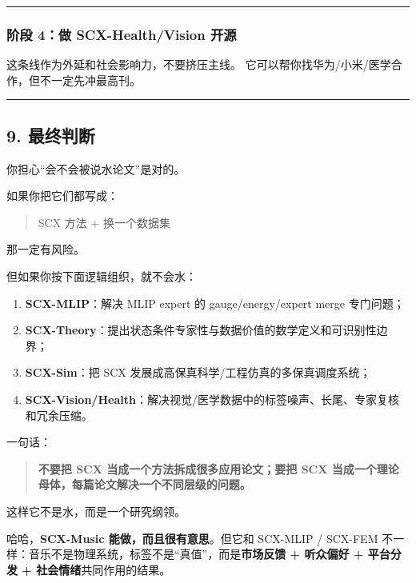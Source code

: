 \documentclass[
  12pt,
]{ctexart}
\providecommand{\tightlist}{%
  \setlength{\itemsep}{0pt}\setlength{\parskip}{0pt}}
\begin{document}
\begin{center}\rule{0.5\linewidth}{0.5pt}\end{center}

\subsubsection{阶段 4：做 SCX-Health/Vision
开源}\label{ux9636ux6bb5-4ux505a-scx-healthvision-ux5f00ux6e90}

这条线作为外延和社会影响力，不要挤压主线。
它可以帮你找华为/小米/医学合作，但不一定先冲最高刊。

\begin{center}\rule{0.5\linewidth}{0.5pt}\end{center}

\subsection{9. 最终判断}\label{ux6700ux7ec8ux5224ux65ad-11}

你担心``会不会被说水论文''是对的。

如果你把它们都写成：

\begin{quote}
SCX 方法 + 换一个数据集
\end{quote}

那一定有风险。

但如果你按下面逻辑组织，就不会水：

\begin{enumerate}
\def\labelenumi{\arabic{enumi}.}
\tightlist
\item
  \textbf{SCX-MLIP}：解决 MLIP expert 的 gauge/energy/expert merge
  专门问题；
\item
  \textbf{SCX-Theory}：提出状态条件专家性与数据价值的数学定义和可识别性边界；
\item
  \textbf{SCX-Sim}：把 SCX 发展成高保真科学/工程仿真的多保真调度系统；
\item
  \textbf{SCX-Vision/Health}：解决视觉/医学数据中的标签噪声、长尾、专家复核和冗余压缩。
\end{enumerate}

一句话：

\begin{quote}
\textbf{不要把 SCX 当成一个方法拆成很多应用论文；要把 SCX
当成一个理论母体，每篇论文解决一个不同层级的问题。}
\end{quote}

这样它不是水，而是一个研究纲领。

哈哈，\textbf{SCX-Music 能做，而且很有意思}。但它和 SCX-MLIP / SCX-FEM
不一样：音乐不是物理系统，标签不是``真值''，而是\textbf{市场反馈 +
听众偏好 + 平台分发 + 社会情绪}共同作用的结果。
\end{document}
